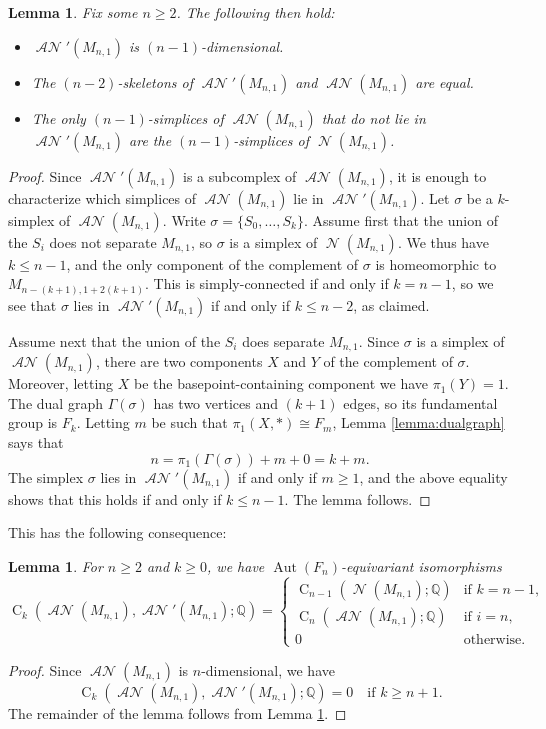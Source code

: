 \documentclass[11pt]{amsart}
\numberwithin{equation}{section}
\theoremstyle{plain}
\newtheorem{lemma}[theorem]{Lemma}
\theoremstyle{definition}
\theoremstyle{remark}
\newcommand\Q{\ensuremath{\mathbb{Q}}}
\DeclareMathOperator{\CC}{C}
\DeclareMathOperator{\Aut}{Aut}
\DeclareMathOperator{\NSpheres}{\mathcal{N}}
\DeclareMathOperator{\ANSpheres}{\mathcal{AN}}
\begin{document}
\begin{lemma}
\label{lemma:subcomplex}
Fix some $n \geq 2$.  The following then hold:
\begin{itemize}
\item $\ANSpheres'(M_{n,1})$ is $(n-1)$-dimensional.
\item The $(n-2)$-skeletons of $\ANSpheres'(M_{n,1})$ and $\ANSpheres(M_{n,1})$ are equal.
\item The only $(n-1)$-simplices of $\ANSpheres(M_{n,1})$ that do not lie in $\ANSpheres'(M_{n,1})$ are the $(n-1)$-simplices
of $\NSpheres(M_{n,1})$.
\end{itemize}
\end{lemma}
\begin{proof}
Since $\ANSpheres'(M_{n,1})$ is a subcomplex of $\ANSpheres(M_{n,1})$, it is enough to characterize which simplices
of $\ANSpheres(M_{n,1})$ lie in $\ANSpheres'(M_{n,1})$.  Let $\sigma$ be a $k$-simplex of $\ANSpheres(M_{n,1})$.  
Write $\sigma = \{S_0,\ldots,S_k\}$.  Assume first that the union of the $S_i$ does not separate $M_{n,1}$, so $\sigma$ is a simplex of $\NSpheres(M_{n,1})$.
We thus have $k \leq n-1$, and the only component of the complement of $\sigma$ is homeomorphic to
$M_{n-(k+1),1+2(k+1)}$.  This is simply-connected if and only if $k = n-1$, so we see that $\sigma$ lies in
$\ANSpheres'(M_{n,1})$ if and only if $k \leq n-2$, as claimed.

Assume next that the union of the $S_i$ does separate $M_{n,1}$.  Since $\sigma$ is a simplex of
$\ANSpheres(M_{n,1})$, there are two components $X$ and $Y$ of the complement of $\sigma$.  Moreover,
letting $X$ be the basepoint-containing component we have $\pi_1(Y) = 1$.  
The dual graph $\Gamma(\sigma)$ has two vertices and $(k+1)$ edges, so its fundamental group
is $F_k$.  Letting $m$ be such that $\pi_1(X,\ast) \cong F_m$, Lemma \ref{lemma:dualgraph} says that
\[n = \pi_1(\Gamma(\sigma)) + m + 0 = k + m.\]
The simplex $\sigma$ lies in $\ANSpheres'(M_{n,1})$ if and only if $m \geq 1$, and the above equality
shows that this holds if and only if $k \leq n-1$.  The lemma follows.
\end{proof}

This has the following consequence:

\begin{lemma}
\label{lemma:identifychains}
For $n \geq 2$ and $k \geq 0$, we have $\Aut(F_n)$-equivariant isomorphisms
\[\CC_k(\ANSpheres(M_{n,1}),\ANSpheres'(M_{n,1});\Q) = \begin{cases}
\CC_{n-1}(\NSpheres(M_{n,1});\Q) & \text{if $k=n-1$},\\
\CC_{n}(\ANSpheres(M_{n,1});\Q)  & \text{if $i=n$}, \\
0  & \text{otherwise}.\end{cases}\]
\end{lemma}
\begin{proof}
Since $\ANSpheres(M_{n,1})$ is $n$-dimensional, we have
\[\CC_k(\ANSpheres(M_{n,1}),\ANSpheres'(M_{n,1});\Q) = 0 \quad \text{if $k \geq n+1$}.\]
The remainder of the lemma follows from Lemma \ref{lemma:subcomplex}.
\end{proof}
\end{document}
